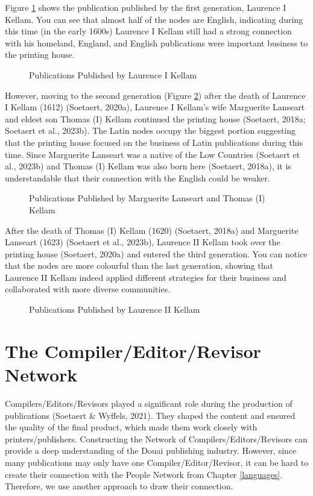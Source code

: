 \documentclass[12pt,a4paper,oneside]{book}
\begin{document}
\begin{sloppypar}
Figure \ref{fig:laurenceI} shows the publication published by the first generation, Laurence I Kellam. You can see that almost half of the nodes are English, indicating during this time (in the early 1600s) Laurence I Kellam still had a strong connection with his homeland, England, and English publications were important business to the printing house.

\begin{figure}[H]
\centering

\caption{Publications Published by Laurence I Kellam}
\label{fig:laurenceI}
\end{figure}

However, moving to the second generation (Figure \ref{fig:margueriteAndThomas}) after the death of Laurence I Kellam (1612) (Soetaert, 2020a), Laurence I Kellam’s wife Marguerite Lanseart and eldest son Thomas (I) Kellam continued the printing house (Soetaert, 2018a; Soetaert et al., 2023b). The Latin nodes occupy the biggest portion suggesting that the printing house focused on the business of Latin publications during this time. Since Marguerite Lanseart was a native of the Low Countries (Soetaert et al., 2023b) and Thomas (I) Kellam was also born here (Soetaert, 2018a), it is understandable that their connection with the English could be weaker.

\begin{figure}[H]
\centering

\caption{Publications Published by Marguerite Lanseart and Thomas (I) Kellam}
\label{fig:margueriteAndThomas}
\end{figure}

After the death of Thomas (I) Kellam (1620) (Soetaert, 2018a) and Marguerite Lanseart (1623) (Soetaert et al., 2023b), Laurence II Kellam took over the printing house (Soetaert, 2020a) and entered the third generation. You can notice that the nodes are more colourful than the last generation, showing that Laurence II Kellam indeed applied different strategies for their business and collaborated with more diverse communities.

\begin{figure}[H]
\centering

\caption{Publications Published by Laurence II Kellam}
\label{fig:laurenceII}
\end{figure}

\section{The Compiler/Editor/Revisor Network}
Compilers/Editors/Revisors played a significant role during the production of publications (Soetaert \& Wyffels, 2021). They shaped the content and ensured the quality of the final product, which made them work closely with printers/publishers. Constructing the Network of Compilers/Editors/Revisors can provide a deep understanding of the Douai publishing industry. However, since many publications may only have one Compiler/Editor/Revisor, it can be hard to create their connection with the People Network from Chapter \ref{languages}. Therefore, we use another approach to draw their connection.


\end{sloppypar}
\end{document}
